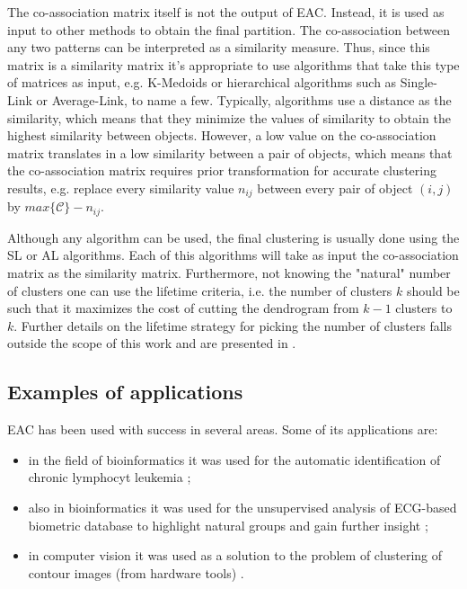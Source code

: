 The co-association matrix itself is not the output of EAC.
Instead, it is used as input to other methods to obtain the final partition.
The co-association between any two patterns can be interpreted as a similarity measure.
Thus, since this matrix is a similarity matrix it's appropriate to use algorithms that take this type of matrices as input, e.g. K-Medoids or hierarchical algorithms such as Single-Link or Average-Link, to name a few.
Typically, algorithms use a distance as the similarity, which means that they minimize the values of similarity to obtain the highest similarity between objects.
However, a low value on the co-association matrix translates in a low similarity between a pair of objects, which means that the co-association matrix requires prior transformation for accurate clustering results, e.g. replace every similarity value $n_{ij}$ between every pair of object $(i,j)$ by $max \{ \mathcal{C} \} - n_{ij}$.

Although any algorithm can be used, the final clustering is usually done using the SL or AL algorithms.
Each of this algorithms will take as input the co-association matrix as the similarity matrix.
Furthermore, not knowing the "natural" number of clusters one can use the lifetime criteria, i.e. the number of clusters $k$ should be such that it maximizes the cost of cutting the dendrogram from $k-1$ clusters to $k$.
Further details on the lifetime strategy for picking the number of clusters falls outside the scope of this work and are presented in \cite{Fred2005}.

\subsection{Examples of applications}

EAC has been used with success in several areas. Some of its applications are:
\begin{itemize}
    \item in the field of bioinformatics it was used for the automatic identification of chronic lymphocyt leukemia \cite{Qian2010};
    \item also in bioinformatics it was used for the unsupervised analysis of ECG-based biometric database to highlight natural groups and gain further insight \cite{LourencoECG2009};
    \item in computer vision it was used as a solution to the problem of clustering of contour images (from hardware tools) \cite{Lourenco2007}.
\end{itemize}

